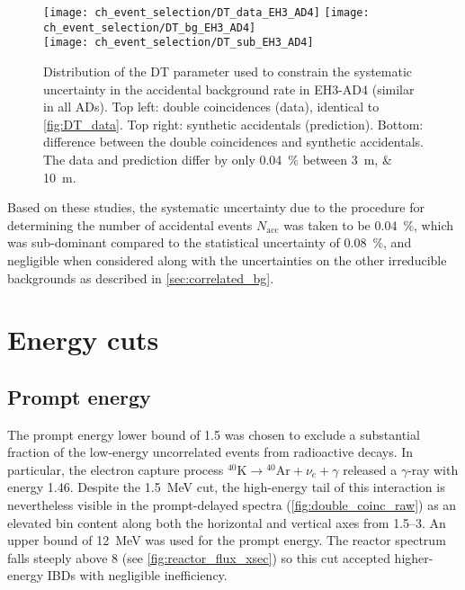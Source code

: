 \begin{figure}
    \centering
    \texttt{[image: ch\_event\_selection/DT\_data\_EH3\_AD4]}
    \texttt{[image: ch\_event\_selection/DT\_bg\_EH3\_AD4]} \\
    \texttt{[image: ch\_event\_selection/DT\_sub\_EH3\_AD4]}
    \caption[Validation of accidentals rate]{
        Distribution of the DT parameter used to constrain
        the systematic uncertainty in the accidental background rate in EH3-AD4
        (similar in all ADs).
        Top left: double coincidences (data), identical to \cref{fig:DT_data}.
        Top right: synthetic accidentals (prediction).
        Bottom: difference between the double coincidences and synthetic accidentals.
        The data and prediction differ by only \SI{0.04}{\percent}
        between \SIlist{3;10}{\m}.
    }
    \label{fig:DT_sub}
\end{figure}

Based on these studies, the systematic uncertainty
due to the procedure for determining the number of accidental events $N_{\text{acc}}$
was taken to be \SI{0.04}{\percent},
which was sub-dominant compared to the statistical uncertainty of \SI{0.08}{\percent},
and negligible when considered along with
the uncertainties on the other irreducible backgrounds
as described in \cref{sec:correlated_bg}.

\section{Energy cuts}
\label{sec:energy_cuts}

\subsection{Prompt energy}
\label{subsec:prompt_energy}
The prompt energy lower bound of \SI{1.5}{\mev}
was chosen to exclude a substantial fraction
of the low-energy uncorrelated events from radioactive decays.
In particular, the electron capture process
${}^{40}\text{K} \to {}^{40}\text{Ar} + \nu_e + \gamma$
released a $\gamma$-ray with energy \SI{1.46}{\mev}.
Despite the \SI{1.5}{\MeV} cut,
the high-energy tail of this interaction is nevertheless visible in the prompt-delayed spectra
(\cref{fig:double_coinc_raw}) as an elevated bin content
along both the horizontal and vertical axes from \SIrange{1.5}{3}{\mev}.
An upper bound of \SI{12}{\MeV} was used for the prompt energy.
The reactor \nuebar{} spectrum falls steeply above \SI{8}{\mev}
(see \cref{fig:reactor_flux_xsec})
so this cut accepted higher-energy IBDs with negligible inefficiency.

